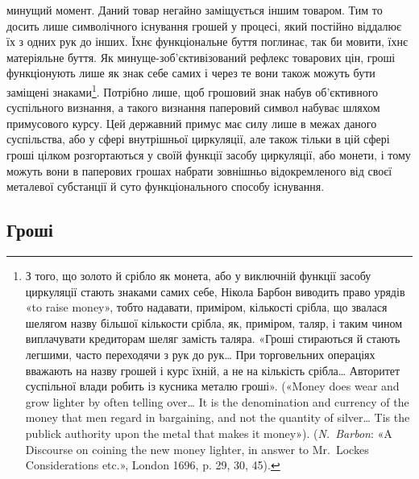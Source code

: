 \parcont{}  %
минущий момент. Даний товар негайно заміщується іншим товаром.
Тим то досить лише символічного існування грошей у процесі,
який постійно віддалює їх з одних рук до інших. Їхнє функціональне
буття поглинає, так би мовити, їхнє матеріяльне буття.
Як минуще-зоб’єктивізований рефлекс товарових цін, гроші
функціонують лише як знак себе самих і через те вони також
можуть бути заміщені знаками\footnote{
З того, що золото й срібло як монета, або у виключній функції
засобу циркуляції стають знаками самих себе, Нікола Барбон виводить
право урядів «to raise money», тобто надавати, приміром, кількості срібла,
що звалася шелягом назву більшої кількости срібла, як, приміром, таляр,
і таким чином виплачувати кредиторам шеляг замість таляра. «Гроші
стираються й стають легшими, часто переходячи з рук до рук\dots{} При торговельних
операціях вважають на назву грошей і курс їхній, а не на кількість
срібла\dots{} Авторитет суспільної влади робить із кусника металю
гроші». («Money does wear and grow lighter by often telling over\dots{} It is
the denomination and currency of the money that men regard in bargaining,
and not the quantity of silver\dots{} Tis the publick authority upon the metal
that makes it money»). (\emph{N.~Barbon}: «A Discourse on coining the new
money lighter, in answer to Mr.~Lockes Considerations etc.», London 1696,
p. 29, 30, 45).
}. Потрібно лише, щоб грошовий
знак набув об’єктивного суспільного визнання, а такого визнання
паперовий символ набуває шляхом примусового курсу. Цей
державний примус має силу лише в межах даного суспільства,
або у сфері внутрішньої циркуляції, але також тільки в цій
сфері гроші цілком розгортаються у своїй функції засобу циркуляції,
або монети, і тому можуть вони в паперових грошах набрати
зовнішньо відокремленого від своєї металевої субстанції й суто
функціонального способу існування.

\subsection{Гроші}

